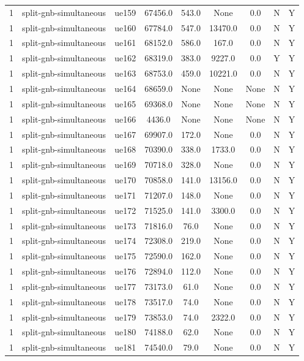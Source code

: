 \begin{table}[ht]
\begin{tabular}{|c|c|c|c|c|c|c|c|c|}
1 & split-gnb-simultaneous & ue159 & 67456.0 & 543.0 & None & 0.0 & N & Y \\
1 & split-gnb-simultaneous & ue160 & 67784.0 & 547.0 & 13470.0 & 0.0 & N & Y \\
1 & split-gnb-simultaneous & ue161 & 68152.0 & 586.0 & 167.0 & 0.0 & N & Y \\
1 & split-gnb-simultaneous & ue162 & 68319.0 & 383.0 & 9227.0 & 0.0 & Y & Y \\
1 & split-gnb-simultaneous & ue163 & 68753.0 & 459.0 & 10221.0 & 0.0 & N & Y \\
1 & split-gnb-simultaneous & ue164 & 68659.0 & None & None & None & N & Y \\
1 & split-gnb-simultaneous & ue165 & 69368.0 & None & None & None & N & Y \\
1 & split-gnb-simultaneous & ue166 & 4436.0 & None & None & None & N & Y \\
1 & split-gnb-simultaneous & ue167 & 69907.0 & 172.0 & None & 0.0 & N & Y \\
1 & split-gnb-simultaneous & ue168 & 70390.0 & 338.0 & 1733.0 & 0.0 & N & Y \\
1 & split-gnb-simultaneous & ue169 & 70718.0 & 328.0 & None & 0.0 & N & Y \\
1 & split-gnb-simultaneous & ue170 & 70858.0 & 141.0 & 13156.0 & 0.0 & N & Y \\
1 & split-gnb-simultaneous & ue171 & 71207.0 & 148.0 & None & 0.0 & N & Y \\
1 & split-gnb-simultaneous & ue172 & 71525.0 & 141.0 & 3300.0 & 0.0 & N & Y \\
1 & split-gnb-simultaneous & ue173 & 71816.0 & 76.0 & None & 0.0 & N & Y \\
1 & split-gnb-simultaneous & ue174 & 72308.0 & 219.0 & None & 0.0 & N & Y \\
1 & split-gnb-simultaneous & ue175 & 72590.0 & 162.0 & None & 0.0 & N & Y \\
1 & split-gnb-simultaneous & ue176 & 72894.0 & 112.0 & None & 0.0 & N & Y \\
1 & split-gnb-simultaneous & ue177 & 73173.0 & 61.0 & None & 0.0 & N & Y \\
1 & split-gnb-simultaneous & ue178 & 73517.0 & 74.0 & None & 0.0 & N & Y \\
1 & split-gnb-simultaneous & ue179 & 73853.0 & 74.0 & 2322.0 & 0.0 & N & Y \\
1 & split-gnb-simultaneous & ue180 & 74188.0 & 62.0 & None & 0.0 & N & Y \\
1 & split-gnb-simultaneous & ue181 & 74540.0 & 79.0 & None & 0.0 & N & Y \\

\end{tabular}
\end{table}
